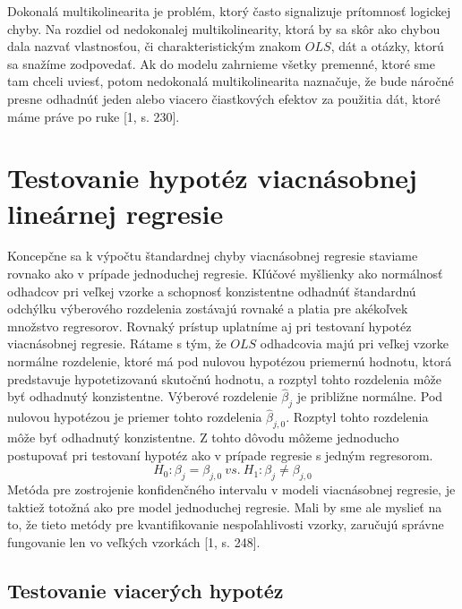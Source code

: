 \documentclass[]{tukediphc}
\begin{document}
Dokonalá multikolinearita je problém, ktorý často signalizuje prítomnosť logickej chyby. Na rozdiel od nedokonalej multikolinearity, ktorá by sa skôr ako chybou dala nazvať vlastnosťou, či charakteristickým znakom $OLS$, dát a otázky, ktorú sa snažíme zodpovedať. Ak do modelu zahrnieme všetky premenné, ktoré sme tam chceli uviesť, potom nedokonalá multikolinearita naznačuje, že bude náročné presne odhadnúť jeden alebo viacero čiastkových efektov za použitia dát, ktoré máme práve po ruke [1, s. 230].  

\newpage
\section{Testovanie hypotéz viacnásobnej lineárnej regresie}

Koncepčne sa k výpočtu štandardnej chyby viacnásobnej regresie staviame rovnako ako v prípade jednoduchej regresie. Kľúčové myšlienky ako normálnosť odhadcov pri veľkej vzorke a schopnosť konzistentne odhadnúť štandardnú odchýlku výberového rozdelenia zostávajú rovnaké a platia pre akékoľvek množstvo regresorov. Rovnaký prístup uplatníme aj pri testovaní hypotéz viacnásobnej regresie. Rátame s tým, že $OLS$ odhadcovia majú pri veľkej vzorke normálne rozdelenie, ktoré má pod nulovou hypotézou priemernú hodnotu, ktorá predstavuje hypotetizovanú skutočnú hodnotu, a rozptyl tohto rozdelenia môže byť odhadnutý konzistentne. Výberové rozdelenie $\hat\beta_j$ je približne normálne. Pod nulovou hypotézou je priemer tohto rozdelenia $\hat\beta_{j,0}$. Rozptyl tohto rozdelenia môže byť odhadnutý konzistentne. Z tohto dôvodu môžeme jednoducho postupovať pri testovaní hypotéz ako v prípade regresie s jedným regresorom.
\begin{equation}
    H_{0}:\beta_j = \beta_{j,0} \ vs. \ H_{1}:\beta_{j} \neq \beta_{j,0}
\end{equation}
Metóda pre zostrojenie konfidenčného intervalu v modeli viacnásobnej regresie, je taktiež totožná ako pre model jednoduchej regresie. Mali by sme ale myslieť na to, že tieto metódy pre kvantifikovanie nespoľahlivosti vzorky, zaručujú správne fungovanie len vo veľkých vzorkách [1, s. 248]. 

\subsection{Testovanie viacerých hypotéz}
\end{document}
